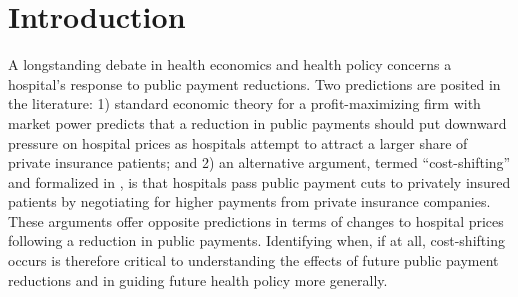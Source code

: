 \documentclass[12pt]{article}
\begin{document}
\section{Introduction}
A longstanding debate in health economics and health policy concerns a hospital's response to public payment reductions. Two predictions are posited in the literature: 1) standard economic theory for a profit-maximizing firm with market power predicts that a reduction in public payments should put downward pressure on hospital prices as hospitals attempt to attract a larger share of private insurance patients; and 2) an alternative argument, termed ``cost-shifting'' and formalized in \cite{dranove1988}, is that hospitals pass public payment cuts to privately insured patients by negotiating for higher payments from private insurance companies. These arguments offer opposite predictions in terms of changes to hospital prices following a reduction in public payments. Identifying when, if at all, cost-shifting occurs is therefore critical to understanding the effects of future public payment reductions and in guiding future health policy more generally.
\end{document}
